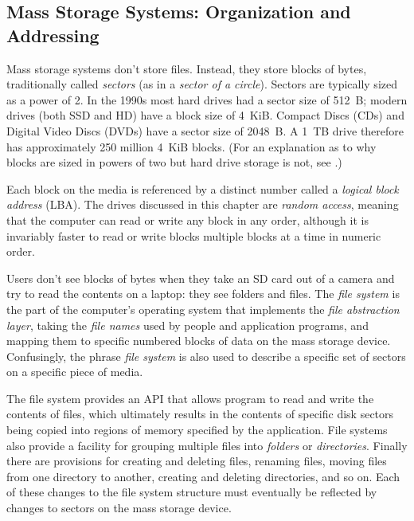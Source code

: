 \subsection{Mass Storage Systems: Organization and Addressing}

Mass storage systems don't store files. Instead, they store blocks of
bytes, traditionally called \emph{sectors} (as in a \emph{sector of a
  circle}). Sectors are typically
sized as a power of 2. In the 1990s most hard drives had a sector
size of 512~B; modern drives (both SSD and HD) have a block size of
4~KiB. Compact Discs (CDs) and Digital Video Discs (DVDs) have a sector size of 2048~B.
A 1~TB drive therefore has approximately 250 million 4~KiB
blocks. (For an explanation as to why blocks are sized in powers of
two but hard drive storage is not, see .)


Each block on the media is referenced by a distinct number
called a \emph{logical block address} (LBA). The drives discussed in
this chapter are
\emph{random access}, meaning that the computer can read or write any
block in any order, although it is invariably faster to read or write
blocks multiple blocks at a time in numeric order.

Users don't see blocks of bytes when they take an SD card out of a
camera and try to read the contents on a laptop: they see folders
and files. The \emph{file system} is the part of the computer's
operating system that implements the \emph{file abstraction layer},
taking the \emph{file names} used by people and application programs,
and mapping them to specific numbered blocks of data on the mass
storage device. 
Confusingly, the phrase \emph{file system} is also used to
describe a specific set of sectors on a specific piece of
media. 
 
The file system provides an API that allows program to read and write
the contents of files, which ultimately results in the contents of
specific disk sectors being copied into regions of memory specified by
the application. File systems also provide a facility for grouping
multiple files into \emph{folders} or
\emph{directories}. Finally there are provisions for creating and
deleting files, renaming files, moving files from one directory to
another, creating and deleting directories, and so on. Each of these
changes to the file system structure must eventually be reflected by
changes to sectors on the mass storage device.

